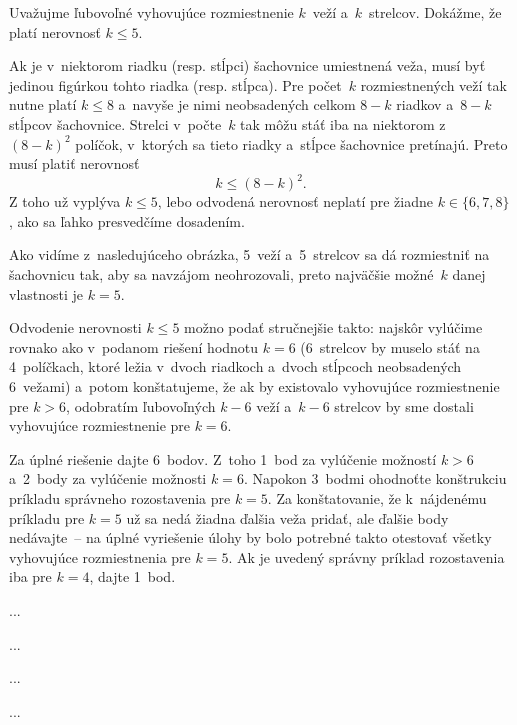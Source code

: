 {%
Uvažujme ľubovoľné vyhovujúce rozmiestnenie $k$~veží a~$k$~strelcov.
Dokážme, že platí nerovnosť $k\le5$.

Ak je v~niektorom riadku (resp. stĺpci) šachovnice umiestnená veža,
musí byť jedinou figúrkou tohto riadka (resp. stĺpca). Pre počet~$k$
rozmiestnených veží tak nutne platí $k\le8$ a~navyše je nimi neobsadených celkom
$8-k$ riadkov a~$8-k$ stĺpcov šachovnice. Strelci v~počte~$k$ tak môžu stáť
iba na niektorom z~$(8-k)^2$ políčok, v~ktorých sa tieto riadky a~stĺpce šachovnice
pretínajú. Preto musí platiť nerovnosť
$$
k\le (8-k)^2.
$$
Z toho už vyplýva $k\le 5$, lebo odvodená nerovnosť neplatí pre žiadne
$k\in\{6, 7, 8\}$, ako sa ľahko presvedčíme dosadením.

Ako vidíme z~nasledujúceho obrázka, 5~veží a~5~strelcov sa dá rozmiestniť
na šachovnicu tak, aby sa navzájom neohrozovali, preto najväčšie
možné~$k$ danej vlastnosti je $k=5$.
%

\poznamka
Odvodenie nerovnosti $k\le5$ možno podať stručnejšie takto: najskôr vylúčime
rovnako ako v~podanom riešení hodnotu $k=6$ (6~strelcov by muselo stáť na 4~políčkach,
ktoré ležia v~dvoch riadkoch a~dvoch stĺpcoch neobsadených 6~vežami) a~potom konštatujeme,
že ak by existovalo vyhovujúce rozmiestnenie pre $k>6$, odobratím ľubovoľných
$k-6$ veží a~$k-6$ strelcov by sme dostali vyhovujúce rozmiestnenie pre $k=6$.


\nobreak\medskip\petit\noindent
Za úplné riešenie dajte 6~bodov. Z~toho 1~bod za vylúčenie
možností $k>6$ a~2~body za vylúčenie možnosti $k=6$. Napokon 3~bodmi
ohodnoťte konštrukciu príkladu správneho rozostavenia pre $k=5$.
Za konštatovanie, že k~nájdenému príkladu pre $k=5$ už sa nedá žiadna
ďalšia veža pridať, ale ďalšie body nedávajte~-- na úplné vyriešenie úlohy
by bolo potrebné takto otestovať všetky vyhovujúce rozmiestnenia pre $k=5$.
Ak je uvedený správny príklad rozostavenia iba pre $k=4$, dajte 1~bod.
\endpetit
}

{%
...}

{%
...}

{%
...}

{%
...}

